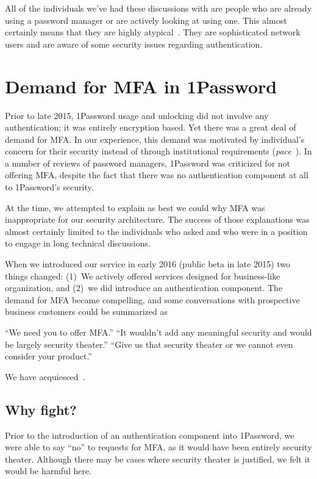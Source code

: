 \documentclass{soups}
\begin{document}
All of the individuals we've had these discussions with are people who are already using a password manager or are actively looking at using one.
This almost certainly means that they are highly atypical~\autocite{Stobert2014:agony}. 
They are sophisticated network users and are aware of some security issues regarding authentication.

\section{Demand for MFA in 1Password}\label{sec:demand}

Prior to late 2015, 1Password usage and unlocking did not involve any
authentication; it was entirely encryption based.
Yet there was a great deal of demand for MFA.
In our experience, this demand was motivated by individual's concern for their security
instead of through institutional requirements (\textit{pace}~\autocite{CristofaroDFN13}).
In a number of reviews of password managers, 1Password was criticized for not offering MFA, despite the fact that there was no authentication component at all to 1Password's security.

At the time, we attempted to explain as best we could why MFA was inappropriate for our security architecture. The success of those explanations was almost certainly limited to the individuals who asked and who were in a position to engage in long technical discussions.

When we introduced our service in early 2016 (public beta in late 2015) two things changed:
(1)~We actively offered services designed for business-like organization, and (2)~we did introduce an authentication component.
The demand for MFA became compelling,
and some conversations with prospective business customers could be summarized as 

“We need you to offer MFA.”\newline
“It wouldn't add any meaningful security and would be largely security theater.”\newline
“Give us that security theater or we cannot even consider your product.”

We have acquiesced~\autocite{Fillion18:mfa}.

\subsection{Why fight?}

Prior to the introduction of an authentication component into 1Password, we were able to say ``no'' to requests for MFA, as it would have been entirely security theater.
Although there may be cases where security theater is justified, we felt it would be harmful here.
\end{document}
